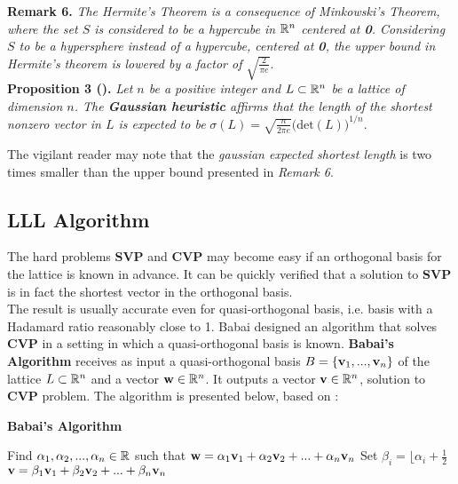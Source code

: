 \textbf{Remark 6.} \textit{The Hermite's Theorem is a consequence of Minkowski's Theorem, where the set $S$ is considered to be a hypercube in $\mathbb{R}^n$ centered at \textbf{0}. Considering $S$ to be a hypersphere instead of a hypercube, centered at \textbf{0}, the upper bound in Hermite's theorem is lowered by a factor of $\sqrt{\frac{2}{\pi e}}$}.\\

\textbf{Proposition 3 (\cite{HPS08}).} \textit{Let $n$ be a positive integer and $L\subset \mathbb{R}^n$ be a lattice of dimension $n$. The \textbf{Gaussian heuristic} affirms that the length of the shortest nonzero vector in $L$ is expected to be} $\sigma(L) = \sqrt{\frac{n}{2\pi e}}\big(\text{det}(L)\big)^{1/n}$.

The vigilant reader may note that the \textit{gaussian expected shortest length} is two times smaller than the upper bound presented in \textit{Remark 6}. \\

\subsection{LLL Algorithm}

The hard problems \textbf{SVP} and \textbf{CVP} may become easy if an orthogonal basis for the lattice is known in advance. It can be quickly verified that a solution to \textbf{SVP} is in fact the shortest vector in the orthogonal basis.\\

The result is usually accurate even for quasi-orthogonal basis, i.e. basis with a Hadamard ratio reasonably close to 1. Babai designed an algorithm that solves \textbf{CVP} in a setting in which a quasi-orthogonal basis is known. \textbf{Babai's Algorithm} receives as input a quasi-orthogonal basis $B = \{\textbf{v}_1,...,\textbf{v}_n\}$ of the lattice $L \subset \mathbb{R}^n$ and a vector $\textbf{w} \in \mathbb{R}^n$. It outputs a vector $\textbf{v}\in \mathbb{R}^n$, solution to \textbf{CVP} problem. The algorithm is presented below, based on \cite{HPS08}:\\


\begin{tcolorbox}[colframe=black,colback=white,arc=0pt,outer arc=0pt]
	\begin{center}
		\textbf{Babai's Algorithm}
	\end{center}
	\begin{algorithmic}[1]
		\State Find $\alpha_1, \alpha_2,...,\alpha_n \in \mathbb{R} $ such that $\textbf{w} = \alpha_1\textbf{v}_1 + \alpha_2\textbf{v}_2+...+\alpha_n\textbf{v}_n$
		\State Set $\beta_i = \big\lfloor \alpha_i + \frac{1}{2}$\big\rfloor
		\EndFor
		\State $\textbf{v} = \beta_1 \textbf{v}_1 + \beta_2 \textbf{v}_2 +...+\beta_n\textbf{v}_n$
	\end{algorithmic}
\end{tcolorbox}
~\\

